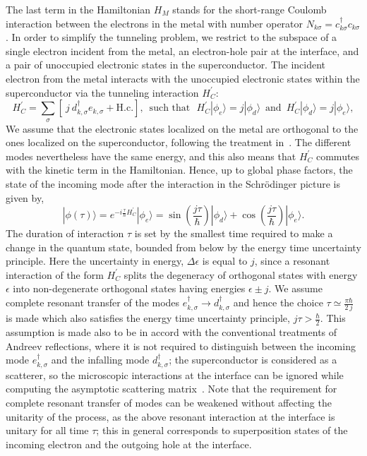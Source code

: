 \documentclass[12pt,letterpaper,aps,onecolumn,superscriptaddress,floatfix,notitlepage]{revtex4-1}
\begin{document}
	The last term in the Hamiltonian $H_{M}$ stands for the short-range Coulomb interaction between the electrons in the metal with number operator $N_{k\sigma}=c_{k\sigma}^{\dagger}c_{k\sigma}$. In order to simplify the tunneling problem, we restrict to the subspace of a single electron incident from the metal, an electron-hole pair at the interface, and a pair of unoccupied electronic states in the superconductor. The incident electron from the metal interacts with the unoccupied electronic states within the superconductor via the tunneling interaction $H^{'}_{C}$:
	\begin{equation}H^{'}_{C} = \sum\limits_{\sigma}[ ~j~d_{k,\sigma}^{\dagger}e_{k,\sigma}+\textrm{H.c.}],
	\,\textrm{ such that }\,\, H^{'}_{C}|\phi_{e}\rangle = j|\phi_{d}\rangle\,\textrm{ and }\,H^{'}_{C}|\phi_{d}\rangle = j|\phi_{e}\rangle,\end{equation}
	We assume  that the electronic states localized on the metal are orthogonal to the ones localized on the superconductor, following the treatment in~\cite{ARsecond}. The different modes nevertheless have the same energy, and this also means that $H^{'}_{C}$ commutes with the kinetic term in the Hamiltonian. Hence, up to global phase factors, the state of the incoming mode after the interaction in the Schr\"{o}dinger picture is given by,
	\begin{equation}\label{sincos}
	|\phi(\tau)\rangle=e^{-i\frac{\tau}{\hbar}H^{'}_{C}}|\phi_{e}\rangle = \sin(\frac{j\tau}{\hbar})|\phi_{d}\rangle+\cos(\frac{j\tau}{\hbar})|\phi_{e}\rangle.
	\end{equation}
	The duration of interaction $\tau$ is set by the smallest time required to make a change in the quantum state, bounded from below by the energy time uncertainty principle. Here the uncertainty in energy, $\Delta\epsilon$ is equal to $j$, since a resonant interaction of the form $H^{'}_{C}$ splits the degeneracy of orthogonal states with energy $\epsilon$ into non-degenerate orthogonal states having energies $\epsilon\pm j$. We assume complete resonant transfer of the modes $e^{\dagger}_{k,\sigma}\rightarrow d^{\dagger}_{k,\sigma}$ and hence the choice 
	$\tau \simeq \frac{\pi\hbar}{2~j}$
	is made which also satisfies the energy time uncertainty principle, $j\tau >\frac{\hbar}{2}$. This assumption is made also to be in accord with the conventional treatments of Andreev reflections, where it is not required to distinguish between the incoming mode $e^{\dagger}_{k,\sigma}$ and the infalling mode $d^{\dagger}_{k,\sigma}$; the superconductor is considered as a scatterer, so the microscopic interactions at the interface can be ignored while computing the asymptotic scattering matrix~\cite{andreev}. Note that the requirement for complete resonant transfer of modes can be weakened without affecting the unitarity of the process, as the above resonant interaction at the interface is unitary for all time $\tau$; this in general corresponds to superposition states of the incoming electron and the outgoing hole at the interface. 
	
\end{document}
